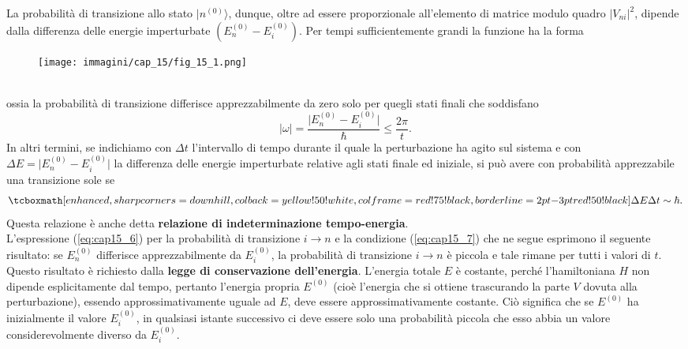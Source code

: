 \documentclass[a4paper,12pt,oneside]{book}
\begin{document}
La probabilità di transizione allo stato $\vert n ^{(0)} \rangle$, dunque, oltre ad essere proporzionale all'elemento di matrice modulo quadro $\vert V_{ni}\vert ^2$, dipende dalla differenza delle energie imperturbate $(E_n ^{(0)} - E_i ^{(0)}) $. Per tempi sufficientemente grandi la funzione ha la forma
\begin{figure}[!htbp]
\begin{center}
\texttt{[image: immagini/cap\_15/fig\_15\_1.png]}
\end{center}
\end{figure}\\
ossia la probabilità di transizione differisce apprezzabilmente da zero solo per quegli stati finali che soddisfano
\begin{equation}
\vert \omega \vert = \frac{\vert E_n ^{(0)} - E_i ^{(0)}\vert}{\hbar} \leq \frac{2\pi}{t}.
\end{equation}
In altri termini, se indichiamo con $\Delta t$ l'intervallo di tempo durante il quale la perturbazione ha agito sul sistema e con $\Delta E = \vert E_n ^{(0)} - E_i ^{(0)}\vert$ la differenza delle energie imperturbate relative agli stati finale ed iniziale, si può avere con probabilità apprezzabile una transizione sole se
	\begin{equation}
		\tcboxmath[enhanced, sharp corners=downhill, colback=yellow!50!white, colframe=red!75!black, borderline={2pt}{-3pt}{red!50!black}]{
			\Delta E \Delta t \sim \hbar .
			}
	\label{eq:cap15_7}
	\end{equation}
Questa relazione è anche detta \textbf{relazione di indeterminazione tempo-energia}.\\

L'espressione (\ref{eq:cap15_6}) per la probabilità di transizione $i\rightarrow n$ e la condizione (\ref{eq:cap15_7}) che ne segue esprimono il seguente risultato: se $E_n ^{(0)}$ differisce apprezzabilmente da   $E_i ^{(0)}$, la probabilità di transizione $i \rightarrow n$ è piccola e tale rimane per tutti i valori di $t$. Questo risultato è richiesto dalla  \textbf{legge di conservazione dell'energia}. L'energia totale $E$ è costante, perché l'hamiltoniana $H$ non dipende esplicitamente dal tempo, pertanto l'energia propria $E^{(0)}$ (cioè l'energia che si ottiene trascurando la parte $V$ dovuta alla perturbazione), essendo approssimativamente uguale ad $E$, deve essere approssimativamente costante. Ciò significa che se $E^{(0)}$ ha inizialmente il valore $E _i ^{(0)}$, in qualsiasi istante successivo ci deve essere solo una probabilità piccola che esso abbia un valore considerevolmente diverso da $E _i ^{(0)}$.\\
\end{document}
